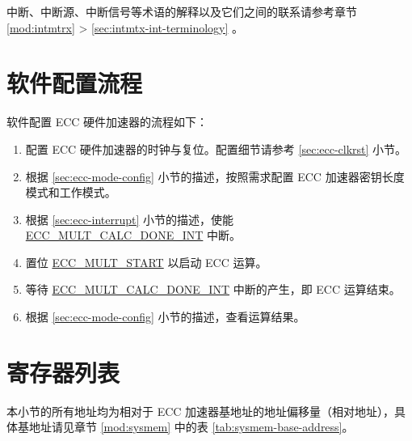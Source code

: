 \documentclass[main\_\_CN.tex]{subfiles}
\begin{document}
\begin{tiplisting}
中断、中断源、中断信号等术语的解释以及它们之间的联系请参考章节 \ref{mod:intmtrx} \textit{} > \ref{sec:intmtx-int-terminology} \textit{}。
\end{tiplisting}



\section{软件配置流程}

软件配置 ECC 硬件加速器的流程如下：

\begin{enumerate}
    \item 配置 ECC 硬件加速器的时钟与复位。配置细节请参考 \ref{sec:ecc-clkrst} 小节。
    \item 根据 \ref{sec:ecc-mode-config} 小节的描述，按照需求配置 ECC 加速器密钥长度模式和工作模式。
    \item 根据 \ref{sec:ecc-interrupt} 小节的描述，使能 \hyperref[int:ECCMULTCALCDONEINT]{ECC\_MULT\_CALC\_DONE\_INT} 中断。
    \item 置位 \hyperref[fielddesc:ECCMULTSTART]{ECC\_MULT\_START} 以启动 ECC 运算。
    \item 等待 \hyperref[int:ECCMULTCALCDONEINT]{ECC\_MULT\_CALC\_DONE\_INT} 中断的产生，即 ECC 运算结束。
    \item 根据 \ref{sec:ecc-mode-config} 小节的描述，查看运算结果。
\end{enumerate}





\newpage
\hypertarget{ecc-reg-summ}{}
\section{寄存器列表}
\label{sec:ecc-reg-summ}

本小节的所有地址均为相对于 ECC 加速器基地址的地址偏移量（相对地址），具体基地址请见章节 \ref{mod:sysmem} \textit{} 中的表 \ref{tab:sysmem-base-address}。
\end{document}
